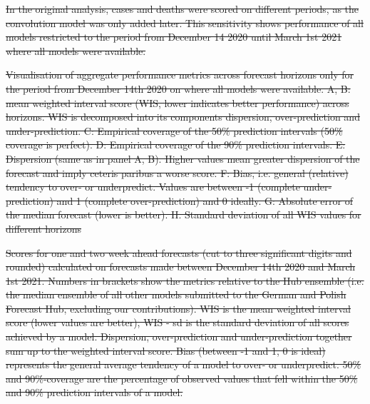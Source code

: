 \documentclass[10pt,letterpaper]{article}
\providecommand{\DIFdeltex}[1]{{\protect\color{red}\sout{#1}}}                      %
\providecommand{\DIFdelFL}[1]{\DIFdel{#1}} %
\providecommand{\DIFdel}[1]{\texorpdfstring{\DIFdeltex{#1}}{}} %
\begin{document}


\DIFdel{In the original analysis, cases and deaths were scored on different
periods, as the convolution model was only added later. This sensitivity
shows performance of all models restricted to the period from December
14 2020 until March 1st 2021 where all models were available.
}%

{%
\DIFdelFL{Visualisation of aggregate performance metrics across forecast horizons only for the period from December 14th 2020 on where all models were available. A, B: mean weighted interval score (WIS, lower indicates better performance) across horizons. WIS is decomposed into its components dispersion, over-prediction and under-prediction. C: Empirical coverage of the 50\% prediction intervals (50\% coverage is perfect). D: Empirical coverage of the 90\% prediction intervals. E: Dispersion (same as in panel A, B). Higher values mean greater dispersion of the forecast and imply ceteris paribus a worse score. F: Bias, i.e. general (relative) tendency to over- or underpredict. Values are between -1 (complete under-prediction) and 1 (complete over-prediction) and 0 ideally. G: Absolute error of the median forecast (lower is better). H. Standard deviation of all WIS values for different horizons}}%

{%
\DIFdelFL{Scores for one and two week ahead forecasts (cut to three significant digits and rounded) calculated on forecasts made between December 14th 2020 and March 1st 2021. Numbers in brackets show the metrics relative to the Hub ensemble (i.e. the median ensemble of all other models submitted to the German and Polish Forecast Hub, excluding our contributions). WIS is the mean weighted interval score (lower values are better), WIS - sd is the standard deviation of all scores achieved by a model. Dispersion, over-prediction and under-prediction together sum up to the weighted interval score. Bias (between -1 and 1, 0 is ideal) represents the general average tendency of a model to over- or underpredict. 50\% and 90\%-coverage are the percentage of observed values that fell within the 50\% and 90\% prediction intervals of a model.}%
\DIFdelFL{\hspace{\textwidth}}}
\end{document}
